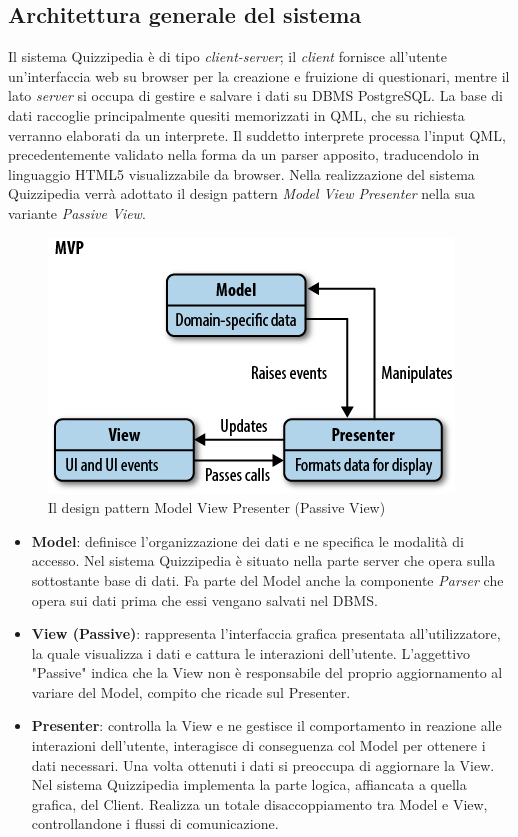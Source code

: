 \rigaregistro{0.0.17}{Luca Alessio (Progettista)}{12/05/2016}{Termine stesura sezione diagrammi e revisione/ampliamento di vari paragrafi}\documentclass[a4paper,11pt]{article}
\begin{document}
	\subsection{Architettura generale del sistema}
	Il sistema Quizzipedia è di tipo \emph{client-server}; il \emph{client} fornisce all'utente un'interfaccia web su browser per la creazione e fruizione di questionari, mentre il lato \emph{server} si occupa di gestire e salvare i dati su DBMS PostgreSQL. La base di dati raccoglie principalmente quesiti memorizzati in QML, che su richiesta verranno elaborati da un interprete.
Il suddetto interprete processa l'input QML, precedentemente validato nella forma da un parser apposito, traducendolo in linguaggio HTML5 visualizzabile da browser.
Nella realizzazione del sistema Quizzipedia verrà adottato il design pattern \emph{Model View Presenter} nella sua variante \emph{Passive View}.
\begin{figure}[h!]
\begin{center}
	\includegraphics[scale=1.3]{../images/mvp.png}
	\caption{Il design pattern Model View Presenter (Passive View)}
\end{center}
\end{figure}
\begin {itemize}
\item\textbf{Model}: definisce l'organizzazione dei dati e ne specifica le modalità di accesso. Nel sistema Quizzipedia è situato nella parte server che opera sulla sottostante base di dati. Fa parte del Model anche la componente \emph{Parser} che opera sui dati prima che essi vengano salvati nel DBMS.
\item\textbf{View (Passive)}: rappresenta l'interfaccia grafica presentata all'utilizzatore, la quale visualizza i dati e cattura le interazioni dell'utente. L'aggettivo "Passive" indica che la View non è responsabile del proprio aggiornamento al variare del Model, compito che ricade sul Presenter.
\item\textbf{Presenter}: controlla la View e ne gestisce il comportamento in reazione alle interazioni dell'utente, interagisce di conseguenza col Model per ottenere i dati necessari.
Una volta ottenuti i dati si preoccupa di aggiornare la View. Nel sistema Quizzipedia implementa la parte logica, affiancata a quella grafica, del Client. Realizza un totale disaccoppiamento tra Model e View, controllandone i flussi di comunicazione.
	\end {itemize}
\end{document}
